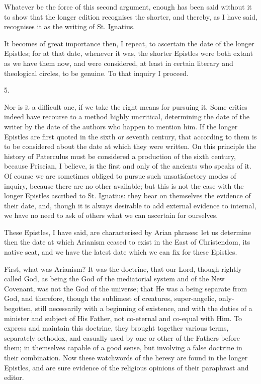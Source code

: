 Whatever be the force of this
second argument, enough has been said without it to show that the
longer edition recognises the shorter, and thereby, as I have said,
recognises it as the writing of St. Ignatius.

It becomes of great importance
then, I repeat, to ascertain the date of the longer Epistles; for at
that date, whenever it was, the shorter Epistles were both extant as
we have them now, and were considered, at least in certain literary
and theological circles, to be genuine. To that inquiry I proceed.

5.

Nor is it a difficult one, if
we take the right means for pursuing it. Some critics indeed have
recourse to a method highly uncritical, determining the date of the
writer by the date of the authors who happen to mention him. If the
longer Epistles are first quoted in the sixth or seventh century, that
according to them is to be considered about the date at which they
were written. On this principle the history of Paterculus must be
considered a production of the sixth century, because Priscian, I
believe, is the first and only of the ancients who speaks of it. Of
course we are sometimes obliged to pursue such unsatisfactory modes of
inquiry, because there are no other available; but this is not
the case with the longer Epistles ascribed to St. Ignatius: they bear
on themselves the evidence of their date, and, though it is always
desirable to add external evidence to internal, we have no need to ask
of others what we can ascertain for ourselves.

These Epistles, I have said,
are characterised by Arian phrases: let us determine then the date at
which Arianism ceased to exist in the East of Christendom, its native
seat, and we have the latest date which we can fix for these Epistles.

First, what was Arianism? It
was the doctrine, that our Lord, though rightly called God, as being
the God of the mediatorial system and of the New Covenant, was not the
God of the universe; that He was a being separate from God, and
therefore, though the sublimest of creatures, super-angelic,
only-begotten, still necessarily with a beginning of existence, and
with the duties of a minister and subject of His Father, not
co-eternal and co-equal with Him. To express and maintain this
doctrine, they brought together various terms, separately orthodox,
and casually used by one or other of the Fathers before them; in
themselves capable of a good sense, but involving a false doctrine in
their combination. Now these watchwords of the heresy are found in the
longer Epistles, and are sure evidence of the religious opinions of
their paraphrast and editor.

